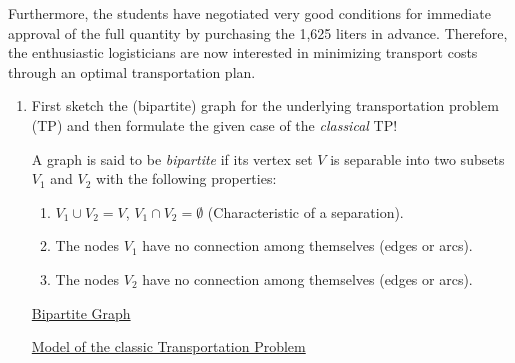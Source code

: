Furthermore, the students have negotiated very good conditions for immediate approval of the full quantity by purchasing the 1,625 liters in advance. Therefore, the enthusiastic logisticians are now interested in minimizing transport costs through an optimal transportation plan.
\begin{enumerate}
	\item \label{a1} First sketch the (bipartite) graph for the underlying transportation problem (TP) and then formulate the given case of the \emph{classical} TP!
	
	\begin{solution}
	A graph is said to be \textit{bipartite} if its vertex set $V$ is separable into two subsets $V_1$ and $V_2$ with the following properties:
		\begin{enumerate}
			\item $V_1\cup V_2=V$, $V_1\cap V_2=\emptyset$ (Characteristic of a separation).
			\item The nodes $V_1$ have no connection among themselves (edges or arcs).
			\item The nodes $V_2$ have no connection among themselves (edges or arcs).
		\end{enumerate}
		\uline{Bipartite Graph}\\
		
		\begin{center}
		\end{center}

		\uline{Model of the classic Transportation Problem}\\
	

\end{solution}
\end{enumerate}
